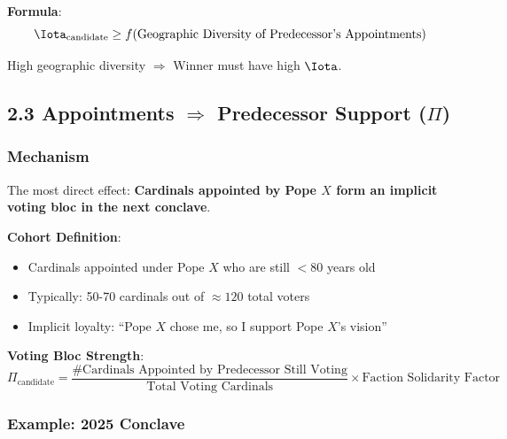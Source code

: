 \documentclass[11pt]{article}
\begin{document}
\textbf{Formula}:
\begin{equation}
\Iota_{\text{candidate}} \geq f(\text{Geographic Diversity of Predecessor's Appointments})
\end{equation}

High geographic diversity $\Rightarrow$ Winner must have high $\Iota$.

\subsection{2.3 Appointments $\Rightarrow$ Predecessor Support ($\Pi$)}

\subsubsection{Mechanism}

The most direct effect: \textbf{Cardinals appointed by Pope $X$ form an implicit voting bloc in the next conclave}.

\textbf{Cohort Definition}:
\begin{itemize}
\item Cardinals appointed under Pope $X$ who are still $<80$ years old
\item Typically: 50-70 cardinals out of $\approx 120$ total voters
\item Implicit loyalty: ``Pope $X$ chose me, so I support Pope $X$'s vision''
\end{itemize}

\textbf{Voting Bloc Strength}:
\begin{equation}
\Pi_{\text{candidate}} = \frac{\text{\# Cardinals Appointed by Predecessor Still Voting}}{\text{Total Voting Cardinals}} \times \text{Faction Solidarity Factor}
\end{equation}

\subsubsection{Example: 2025 Conclave}
\end{document}

